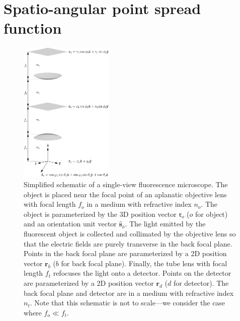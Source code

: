 \documentclass[11pt]{article}
\providecommand{\ro}[1]{\mathbf{\mathfrak{r}}_o}
\providecommand{\so}[1]{\mathbf{\hat{s}}_o}
\providecommand{\rb}[1]{\mathbf{r}_b}
\providecommand{\rd}[1]{\mathbf{r}_d}
\begin{document}
\section{Spatio-angular point spread function}
\begin{figure}[h]
 \captionsetup{width=1.0\linewidth}
 \centering
   \centering
   \includegraphics[width = 0.4\textwidth]{../figures/schematic.pdf}
   \caption{Simplified schematic of a single-view fluorescence microscope. The
     object is placed near the focal point of an aplanatic objective lens with
     focal length $f_{o}$ in a medium with refractive index $n_o$. The object is
     parameterized by the 3D position vector $\ro{}$ ($o$ for object) and an
     orientation unit vector $\so{}$. The light emitted by the fluorescent
     object is collected and collimated by the objective lens so that the
     electric fields are purely transverse in the back focal plane. Points in
     the back focal plane are parameterized by a 2D position vector $\rb{}$ ($b$
     for back focal plane). Finally, the tube lens with focal length $f_t$
     refocuses the light onto a detector. Points on the detector are
     parameterized by a 2D position vector $\rd{}$ ($d$ for detector). The back
     focal plane and detector are in a medium with refractive index $n_t$. Note
     that this schematic is not to scale---we consider the case where
     $f_o \ll f_t$.}
   \label{fig:frames_a}
\end{figure}
\end{document}
